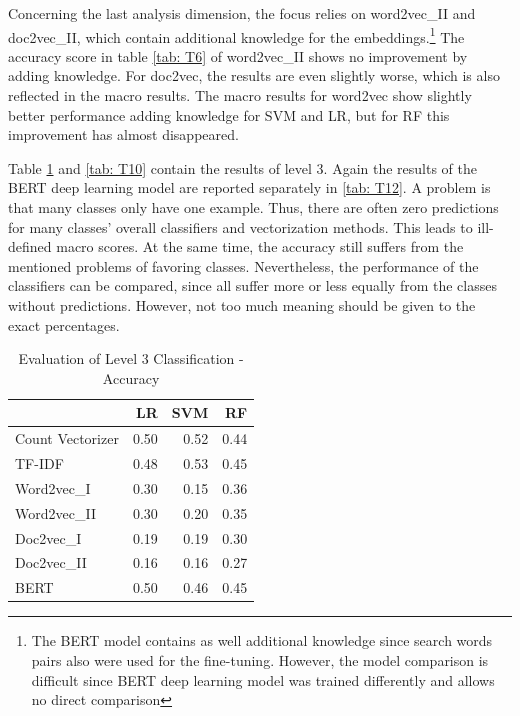 \documentclass[12pt, a4paper, titlepage]{article}
\begin{document}
Concerning the last analysis dimension, the focus relies on word2vec\_II and doc2vec\_II, which contain additional knowledge for the embeddings.\footnote{The \ac{BERT} model contains as well additional knowledge since search words pairs also were used for the fine-tuning. However, the model comparison is difficult since \ac{BERT} deep learning model was trained differently and allows no direct comparison} The accuracy score in table \ref{tab: T6}  of word2vec\_II shows no improvement by adding knowledge. For doc2vec, the results are even slightly worse, which is also reflected in the macro results. The macro results for word2vec show slightly better performance adding knowledge for \ac{SVM} and \ac{LR}, but for \ac{RF} this improvement has almost disappeared.

Table \ref{tab: T8} and \ref{tab: T10} contain the results of level 3. Again the results of the \ac{BERT} deep learning model are reported separately in \ref{tab: T12}. A problem is that many classes only have one example. Thus, there are often zero predictions for many classes' overall classifiers and vectorization methods. This leads to ill-defined macro scores. At the same time, the accuracy still suffers from the mentioned problems of favoring classes. Nevertheless, the performance of the classifiers can be compared, since all suffer more or less equally from the classes without predictions. However, not too much meaning should be given to the exact percentages.

\begin{table}[hb!]
  \center
\begin{tabular}{lrrr}
\hline
{} &   \textbf{LR} &   \textbf{SVM} &    \textbf{RF} \\
\hline
Count Vectorizer &  0.50 &  0.52 &  0.44 \\
TF-IDF           &  0.48 &  0.53 &  0.45 \\
Word2vec\_I      &  0.30 &  0.15 &  0.36 \\
Word2vec\_II     &  0.30 &  0.20 &  0.35 \\
Doc2vec\_I       &  0.19 &  0.19 &  0.30 \\
Doc2vec\_II      &  0.16 &  0.16 &  0.27 \\
BERT            &  0.50 &  0.46 &  0.45 \\
\hline
\end{tabular}
\caption{\label{tab: T8} Evaluation of Level 3 Classification - Accuracy}
\end{table}
\end{document}
